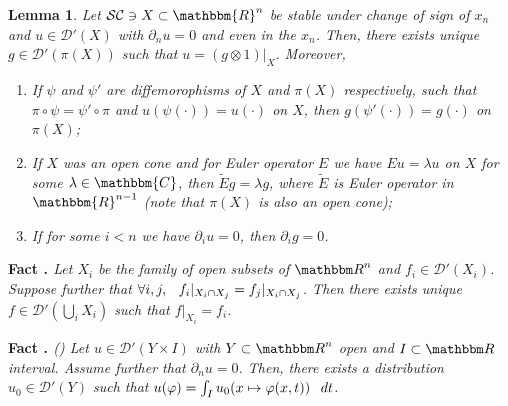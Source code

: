 \documentclass{article}
\newcommand{\tmtextbf}[1]{{\bfseries{#1}}}
\newcommand{\tmtextit}[1]{{\itshape{#1}}}
\newcommand{\tmtextup}[1]{{\upshape{#1}}}
\numberwithin{definition}{section}
\newtheorem{lemma}{Lemma}
\numberwithin{lemma}{section}
\numberwithin{proposition}{section}
{\theorembodyfont{\rmfamily}\newtheorem{remark}{Remark}
\numberwithin{remark}{section}
}
\newcommand{\D}{\mathcal{D}} \newcommand{\supp}{supp}
\newcommand{\proofexplanation}[1]{(#1)}
\begin{document}
\begin{lemma}
  \label{lem67:lem-tensor-aux}Let $\mathcal{S}\mathcal{C} \ni X \subset
  \mathbbm{R}^n$ be stable under change of sign of $x_n$ and $u \in
  \mathcal{D}' ( X)$ with $\partial_n u = 0$ and even in the $x_n$. Then,
  there exists unique $g \in \mathcal{D}' ( \pi ( X))$ such that $u = ( g
  \otimes 1) |_X$. Moreover,
  \begin{enumerate}
    \item If $\psi$ and $\psi'$ are diffemorophisms of $X$ and $\pi ( X)$
    respectively, such that $\pi \circ \psi = \psi' \circ \pi$ and $u ( \psi (
    \cdot)) = u ( \cdot)$ on $X$, then $g ( \psi' ( \cdot)) = g ( \cdot)$ on
    $\pi ( X)$;
    
    \item If $X$ was an open cone and for Euler operator $E$ we have $E u =
    \lambda u$ on $X$ for some $\lambda \in \mathbbm{C}$, then $\tilde{E} g =
    \lambda g$, where $\tilde{E}$ is Euler operator in $\mathbbm{R}^{n - 1}$
    (note that $\pi ( X)$ is also an open cone);
    
    \item If for some $i < n$ we have $\partial_i u = 0$, then $\partial_i g =
    0$.
  \end{enumerate}
\end{lemma}

{\noindent}\tmtextbf{Fact \tmtextup{12}.
}\tmtextit{\label{fact:localization}{\cite[Thm 2.2.4]{hormander1983analysis}}
Let $X_i$ be the family of open subsets of $\R^n$ and $f_i \in \D' (X_i)$.
Suppose further that $\forall i, j, \hspace{0.75em} f_i |_{X_i \cap X_j} = f_j
|_{X_i \cap X_j}$. Then there exists unique $f \in \D' ( \bigcup_i X_i)$ such
that $f |_{X_i} = f_i$.}{\hspace*{\fill}}{\medskip}

{\noindent}\tmtextbf{Fact \tmtextup{13}.
}\tmtextit{{\proofexplanation{{\cite[Thm. 3.1.4']{hormander1983analysis}}}}
\label{fact:sing-q-4}Let $u \in \D' (Y \times I)$ with $Y \subset \R^n$ open
and $I \subset \R$ interval. Assume further that $\partial_n u = 0$. Then,
there exists a distribution $u_0 \in \D' (Y)$ such that $u (\varphi) = \int_I
u_0  (x \mapsto \varphi (x, t))  \hspace{0.75em}
dt$.}{\hspace*{\fill}}{\medskip}
\end{document}
